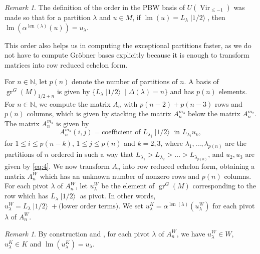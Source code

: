 \documentclass[a4paper, 12pt, reqno]{amsart}
\theoremstyle{remark}
\newtheorem{remark}[theorem]{Remark}
\DeclareMathOperator{\Vir}{Vir}
\DeclareMathOperator{\gr}{gr}
\DeclareMathOperator{\lm}{lm}
\DeclareMathOperator{\len}{len}
\DeclareMathOperator{\vachalf}{|1/2\rangle}
\begin{document}
\begin{remark}
  \label{rmk:6}
  The definition of the order in the PBW basis of $U(\Vir_{\le -1})$ was made so that for a partition $\lambda$ and $u \in M$, if $\lm(u) = L_{\lambda}\vachalf$, then $\lm(\alpha^{\len(\lambda)}(u)) = u_{\lambda}$.

  This order also helps us in computing the exceptional partitions faster, as we do not have to compute Gröbner bases explicitly because it is enough to transform matrices into row reduced echelon form.
\end{remark}

For $n \in \mathbb{N}$, let $p(n)$ denote the number of partitions of $n$.
A basis of $\gr^G(M)_{1/2 + n}$ is given by $\{L_{\lambda}\vachalf \mid \Delta(\lambda) = n\}$ and has $p(n)$ elements.
For $n \in \mathbb{N}$, we compute the matrix $A_n$ with $p(n - 2) + p(n - 3)$ rows and $p(n)$ columns, which is given by stacking the matrix $A^{m_3}_n$ below the matrix $A^{m_2}_n$.
The matrix $A^{m_k}_n$ is given by
\begin{equation*}
  A^{m_k}_n(i, j) = \text{coefficient of $L_{\lambda_j}\vachalf$ in $L_{\lambda_i}u_k$},
\end{equation*}
for $1 \le i \le p(n - k)$, $1 \le j \le p(n)$ and $k = 2, 3$, where $\lambda_1, \dots, \lambda_{p(n)}$ are the partitions of $n$ ordered in such a way that $L_{\lambda_1} > L_{\lambda_2} > \dots > L_{\lambda_{p(n)}}$, and $u_2, u_3$ are given by \eqref{eq:4}.
We now transform $A_n$ into row reduced echelon form, obtaining a matrix $A^W_n$ which has an unknown number of nonzero rows and $p(n)$ columns.
For each pivot $\lambda$ of $A^W_n$, let $u^W_{\lambda}$ be the element of $\gr^G(M)$ corresponding to the row which has $L_{\lambda}\vachalf$ as pivot.
In other words, $u^W_{\lambda} = L_{\lambda}\vachalf + \text{(lower order terms)}$.
We set $u^K_{\lambda} = \alpha^{\len(\lambda)}(u^W_{\lambda})$ for each pivot $\lambda$ of $A^W_n$.

\begin{remark}
  \label{rmk:7}
  By construction and , for each pivot $\lambda$ of $A^W_n$, we have $u^W_{\lambda} \in W$, $u^K_{\lambda} \in K$ and $\lm(u^K_{\lambda}) = u_{\lambda}$.
\end{remark}
\end{document}
